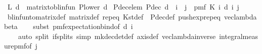 \begin{isabellebody}
\isamarkupfalse%
\ {\isachardoublequoteopen}{\isasymP}\isactrlsub L\ d\ {\isacharequal}{\kern0pt}\ matrix{\isacharunderscore}{\kern0pt}to{\isacharunderscore}{\kern0pt}blinfun\ {\isacharparenleft}{\kern0pt}P{\isacharunderscore}{\kern0pt}lower\ d{\isacharparenright}{\kern0pt}{\isachardoublequoteclose}\isanewline
\isanewline
{}\isamarkupfalse%
\ P{\isacharunderscore}{\kern0pt}dec{\isacharunderscore}{\kern0pt}elem{\isacharcolon}{\kern0pt}\ {\isachardoublequoteopen}P{\isacharunderscore}{\kern0pt}dec\ d\ {\isachardollar}{\kern0pt}\ i\ {\isachardollar}{\kern0pt}\ j\ {\isacharequal}{\kern0pt}\ pmf\ {\isacharparenleft}{\kern0pt}K\ {\isacharparenleft}{\kern0pt}i{\isacharcomma}{\kern0pt}\ d\ i{\isacharparenright}{\kern0pt}{\isacharparenright}{\kern0pt}\ j{\isachardoublequoteclose}\isanewline
%
\isadelimproof
\ \ %
\endisadelimproof
%
\isatagproof
{}\isamarkupfalse%
\ blinfun{\isacharunderscore}{\kern0pt}to{\isacharunderscore}{\kern0pt}matrix{\isacharunderscore}{\kern0pt}def\ matrix{\isacharunderscore}{\kern0pt}def\ {\isasymP}rep{\isacharunderscore}{\kern0pt}eq\ K{\isacharunderscore}{\kern0pt}st{\isacharunderscore}{\kern0pt}def\ \ P{\isacharunderscore}{\kern0pt}dec{\isacharunderscore}{\kern0pt}def\ push{\isacharunderscore}{\kern0pt}exp{\isachardot}{\kern0pt}rep{\isacharunderscore}{\kern0pt}eq\ vec{\isacharunderscore}{\kern0pt}lambda{\isacharunderscore}{\kern0pt}beta\isanewline
\ \ \isamarkupfalse%
\ {\isacharparenleft}{\kern0pt}subst\ pmf{\isacharunderscore}{\kern0pt}expectation{\isacharunderscore}{\kern0pt}bind{\isacharbrackleft}{\kern0pt}of\ {\isachardoublequoteopen}{\isacharbraceleft}{\kern0pt}d\ i{\isacharbraceright}{\kern0pt}{\isachardoublequoteclose}{\isacharbrackright}{\kern0pt}{\isacharparenright}{\kern0pt}\ \isanewline
\ \ \ \ {\isacharparenleft}{\kern0pt}auto\ split{\isacharcolon}{\kern0pt}\ if{\isacharunderscore}{\kern0pt}splits\ simp{\isacharcolon}{\kern0pt}\ mk{\isacharunderscore}{\kern0pt}dec{\isacharunderscore}{\kern0pt}det{\isacharunderscore}{\kern0pt}def\ axis{\isacharunderscore}{\kern0pt}def\ vec{\isacharunderscore}{\kern0pt}lambda{\isacharunderscore}{\kern0pt}inverse\ integral{\isacharunderscore}{\kern0pt}measure{\isacharunderscore}{\kern0pt}pmf{\isacharbrackleft}{\kern0pt}of\ {\isachardoublequoteopen}{\isacharbraceleft}{\kern0pt}j{\isacharbraceright}{\kern0pt}{\isachardoublequoteclose}{\isacharbrackright}{\kern0pt}{\isacharparenright}{\kern0pt}%
\endisatagproof
{\isafoldproof}%
%
\isadelimproof
\ \ \isanewline
%
\endisadelimproof

\end{isabellebody}
